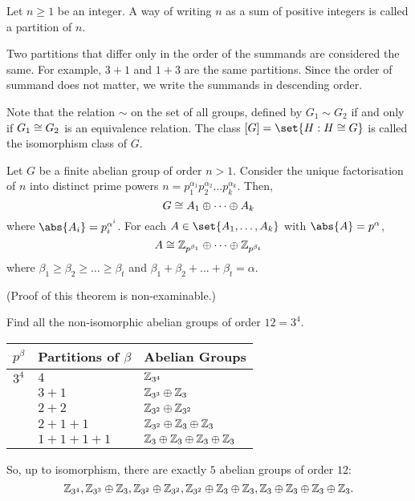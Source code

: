 \documentclass[11pt]{penrose}
\begin{document}
\begin{ndfn}
    Let $n \geq 1$ be an integer. A way of writing $n$ as a sum of positive integers is called a partition of $n$.
\end{ndfn}

Two partitions that differ only in the order of the summands are considered the same. For example, $3+1$ and $1+3$ are the same partitions. Since the order of summand does not matter, we write the summands in descending order.

Note that the relation $\sim$ on the set of all groups, defined by $G_{1} \sim G_{2}$ if and only if $G_{1} \mathrel{\cong} G_{2}$ is an equivalence relation. The class $[G] = \set{H : H \isom G}$ is called the isomorphism class of $G$.

\begin{nthm}
    Let $G$ be a finite abelian group of order $n > 1$. Consider the unique factorisation of $n$ into distinct prime powers $n = p_{1}^{\alpha_{1}} p_{2}^{\alpha_{2}} \dots p_{k}^{\alpha_{k}}$. Then,
    \begin{equation*}
        G \mathrel{\cong} A_{1} \oplus \dots \oplus A_{k}
    \end{equation*}
    where $\abs{A_{i}} = p_{i}^{\alpha^{i}}$. For each $A \in \set{A_{1}, \dots, A_{k}}$ with $\abs{A} = p^{\alpha}$,
    \begin{equation*}
        A \mathrel{\cong} \mathbb{Z}_{p^{\beta_{1}}} \oplus \dots \oplus \mathbb{Z}_{p^{\beta_{t}}}
    \end{equation*}
    where $\beta_{1} \geq \beta_{2} \geq \dots \geq \beta_{t}$ and $\beta_{1} + \beta_{2} + \dots + \beta_{t} = \alpha$.
\end{nthm}
(Proof of this theorem is non-examinable.)

\begin{negg}
    Find all the non-isomorphic abelian groups of order $12 = 3^{4}$.
    \begin{center}
        \begin{tabularx}{0.66\textwidth}{p{8mm}XX}
            \toprule
            $p^{\beta}$ & Partitions of $\beta$ & Abelian Groups\\
            \midrule
            $3^{4}$ & $4$ & $\mathbb{Z}_{3^{4}}$ \\
                    & $3+1$ & $\mathbb{Z}_{3^{3}} \oplus \mathbb{Z}_{3}$ \\
                    & $2+2$ & $\mathbb{Z}_{3^{2}} \oplus \mathbb{Z}_{3^{2}}$ \\
                    & $2+1+1$ & $\mathbb{Z}_{3^{2}} \oplus \mathbb{Z}_{3} \oplus \mathbb{Z}_{3}$ \\
                    & $1+1+1+1$ & $\mathbb{Z}_{3} \oplus \mathbb{Z}_{3} \oplus \mathbb{Z}_{3} \oplus \mathbb{Z}_{3}$ \\
            \bottomrule
        \end{tabularx}
    \end{center}
    So, up to isomorphism, there are exactly $5$ abelian groups of order $12$:
    \begin{equation*}
        \mathbb{Z}_{3^{4}}, \mathbb{Z}_{3^{3}} \oplus \mathbb{Z}_{3}, \mathbb{Z}_{3^{2}} \oplus \mathbb{Z}_{3^{2}}, \mathbb{Z}_{3^{2}} \oplus \mathbb{Z}_{3} \oplus \mathbb{Z}_{3}, \mathbb{Z}_{3} \oplus \mathbb{Z}_{3} \oplus \mathbb{Z}_{3} \oplus \mathbb{Z}_{3}.
    \end{equation*}
\end{negg}
\end{document}
